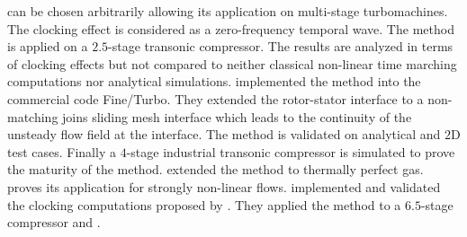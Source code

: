 can be chosen arbitrarily allowing its application on multi-stage
turbomachines. The clocking effect is considered as a zero-frequency
temporal wave. The method is applied on a $2.5$-stage transonic
compressor. The results are analyzed in terms of clocking effects
but not compared to neither classical non-linear time marching 
computations nor analytical simulations.
\citet{Vilmin2006} implemented the method into
the commercial code Fine/Turbo. They extended the rotor-stator
interface to a non-matching joins sliding mesh interface which
leads to the continuity of the unsteady flow field at the interface.
The method is validated on analytical and $2$D test cases. Finally
a $4$-stage industrial transonic compressor is simulated to prove the 
maturity of the method.
\citet{Vilmin2007} extended the method to thermally perfect gas.
\citet{He2008} proves its application for strongly non-linear flows.
\citet{Vilmin2009} implemented and validated the clocking computations
proposed by \citet{He2002}. They applied the method 
to a $6.5$-stage compressor and .



